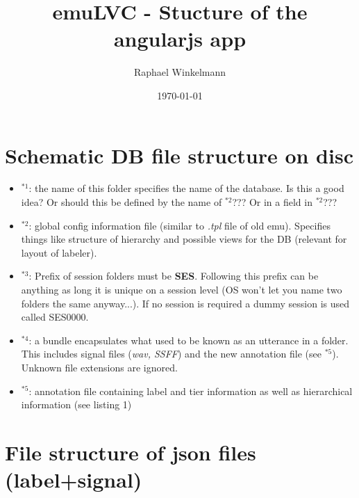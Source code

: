 \documentclass[A4,12pt, utf8]{article}
\title{emuLVC - Stucture of the angularjs app}
\author{Raphael Winkelmann}
\date{\today}
\newcounter{treeline}
\newcommand{\treeroot}[1]{%
\node[above] at (0,0) {#1};%
\setcounter{treeline}{0}
}
\newcommand{\altentry}[2]{%
\draw[->] (#2-1,-\value{treeline}/2) -- (#2-1,-\value{treeline}/2-0.5) -- (#2+0.5,-\value{treeline}/2-0.5) node[right] {#1};
\foreach \x in {1,...,#2}
{   \draw (\x-1,-\value{treeline}/2) -- (\x-1,-\value{treeline}/2-0.5);
}
\stepcounter{treeline}
}
\begin{document}

\section{Schematic DB file structure on disc}



\begin{itemize}
  \item $^{*1}$: the name of this folder specifies the name of the database. Is this a good idea? Or should this be defined by the name of $^{*2}$??? Or in a field in $^{*2}$???
  \item $^{*2}$: global config information file (similar to \textit{.tpl} file of old emu). Specifies things like structure of hierarchy and possible views for the DB (relevant for layout of labeler).
  \item $^{*3}$: Prefix of session folders must be \textbf{SES}. Following this prefix can be anything as long it is unique on a session level (OS won't let you name two folders the same anyway...). If no session is required a dummy session is used called SES0000.
  \item $^{*4}$: a bundle encapsulates what used to be known as an utterance in a folder. This includes signal files (\textit{wav, SSFF}) and the new annotation file (see $^{*5}$). Unknown file extensions are ignored.
  \item $^{*5}$: annotation file containing label and tier information as well as hierarchical information (see listing 1)
\end{itemize}




\section{File structure of json files (label+signal)}
\end{document}

